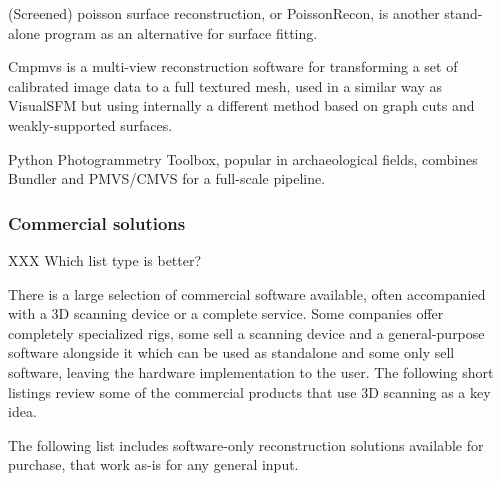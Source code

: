 (Screened) poisson surface reconstruction, or PoissonRecon, is another stand-alone program as an alternative for surface fitting. \cite{kazhdan2013screened}

Cmpmvs is a multi-view reconstruction software for transforming a set of calibrated image data to a full textured mesh, used in a similar way as VisualSFM but using internally a different method based on graph cuts and weakly-supported surfaces.
\cite{jancosek2011multi}

Python Photogrammetry Toolbox, popular in archaeological fields, combines Bundler and PMVS/CMVS for a full-scale pipeline. \cite{moulon2011python}



\subsubsection{Commercial solutions} %

{ \color{red} XXX Which list type is better? }

There is a large selection of commercial software available, often accompanied with a 3D scanning device or a complete service.
Some companies offer completely specialized rigs, some sell a scanning device and a general-purpose software alongside it which can be used as standalone and some only sell software, leaving the hardware implementation to the user.
The following short listings review some of the commercial products that use 3D scanning as a key idea.


The following list includes software-only reconstruction solutions available for purchase, that work as-is for any general input.

